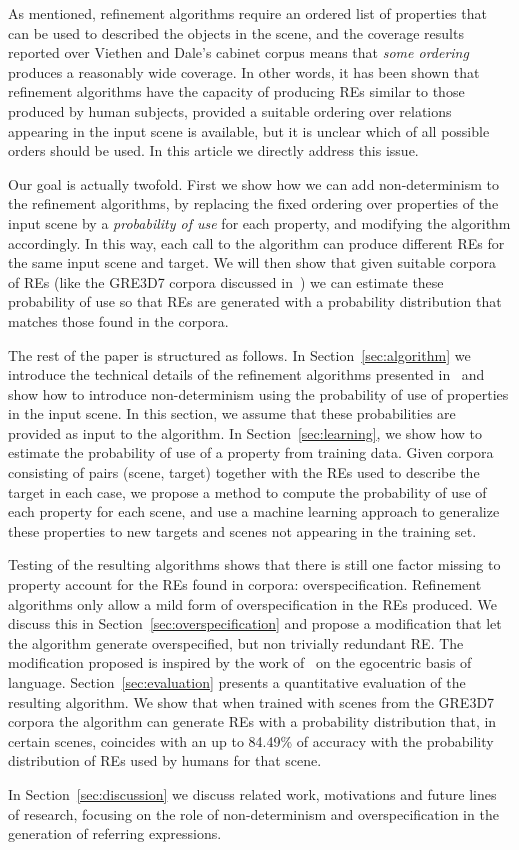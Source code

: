 As mentioned, refinement algorithms require an 
ordered list of properties that can be used to described the objects in the scene, and the coverage results reported over Viethen and 
Dale's cabinet corpus means that \emph{some ordering} produces a reasonably wide coverage.  In other words, it has been shown that refinement algorithms have the capacity of producing REs similar to those produced by human subjects, provided a suitable ordering over relations appearing 
in the input scene is available, but it is unclear which of all possible orders should be used.  In this article we directly address this issue.  

Our goal is actually twofold. First we show how we can add non-determinism to the refinement algorithms, by replacing the fixed ordering 
over properties of the input scene by a \emph{probability of use} for each property, and modifying the algorithm accordingly.  
In this way, each call to the algorithm can produce different REs for the same input scene and target.  We will then show that given suitable corpora of REs (like the GRE3D7 corpora discussed in~\cite{viet:gene11}) we can estimate these probability of use so that REs are generated with a probability distribution that matches those found in the corpora.  

The rest of the paper is structured as follows. In Section~\ref{sec:algorithm} we introduce the technical details of the 
refinement algorithms presented in~\cite{arec2:2008:Areces,arec:usin11} and show how to introduce non-determinism using 
the probability of use of properties in the input scene.  In this section, we assume that these probabilities are provided as 
input to the algorithm. In Section~\ref{sec:learning}, we show how to estimate the 
probability of use of a property from training data. Given corpora consisting of pairs (scene, target) together with the REs used to 
describe the target in each case, we propose a method to compute the probability of use of each property for each scene, and use a machine learning approach to generalize these properties to new targets and scenes not appearing in the training set. 

Testing of the resulting algorithms shows that there is still one factor missing to property account for the REs found in corpora: overspecification.  Refinement algorithms only allow a mild form of overspecification in the REs produced.  We discuss this in Section~\ref{sec:overspecification} and propose a modification that let the algorithm generate overspecified, but non trivially redundant RE.  The modification proposed is inspired by the work of~ on the egocentric basis of language.  
Section~\ref{sec:evaluation} presents a quantitative evaluation of the resulting algorithm. We show that when trained with scenes from the GRE3D7 corpora the algorithm can generate REs with a probability distribution that, in certain scenes, coincides with an up to 84.49\% of accuracy with the probability distribution of REs used by humans for that scene. 

In Section~\ref{sec:discussion} we discuss related work, motivations and future lines of research, focusing on the role of non-determinism and overspecification in the generation of referring expressions. 

